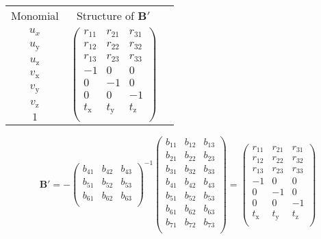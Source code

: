 \begin{center}
	\begin{tabular}{ c c c }
		Monomial & Structure of $\textbf{B}'$ &  \\
		$u_x$ & \multirow{7}{*}{
			$\begin{pmatrix}
			r_{11} & r_{21} & r_{31} \\
			r_{12} & r_{22} & r_{32} \\
			r_{13} & r_{23} & r_{33} \\
			-1 & 0 & 0 \\
			0 & -1 & 0 \\
			0 & 0 & -1 \\
			t_\mathrm{x} & t_\mathrm{y} & t_\mathrm{z} \\
			\end{pmatrix}$
		} \\
		$u_\mathrm{y}$ & \\
		$u_\mathrm{z}$ & \\    
		\hline
		$v_\mathrm{x}$ & \\
		$v_\mathrm{y}$ & \\
		$v_\mathrm{z}$ & \\    
		\hline
		$1$ & \\
	\end{tabular}
\end{center}

\begin{equation}
\textbf{B}'=
-
\begin{pmatrix}
b_{41} & b_{42} & b_{43} \\
b_{51} & b_{52} & b_{53} \\
b_{61} & b_{62} & b_{63} \\
\end{pmatrix}^{-1}
\begin{pmatrix}
b_{11} & b_{12} & b_{13} \\
b_{21} & b_{22} & b_{23} \\
b_{31} & b_{32} & b_{33} \\
b_{41} & b_{42} & b_{43} \\
b_{51} & b_{52} & b_{53} \\
b_{61} & b_{62} & b_{63} \\
b_{71} & b_{72} & b_{73} \\
\end{pmatrix}
=
\begin{pmatrix}
r_{11} & r_{21} & r_{31} \\
r_{12} & r_{22} & r_{32} \\
r_{13} & r_{23} & r_{33} \\
-1 & 0 & 0 \\
0 & -1 & 0 \\
0 & 0 & -1 \\
t_\mathrm{x} & t_\mathrm{y} & t_\mathrm{z} \\
\end{pmatrix}
\end{equation}

